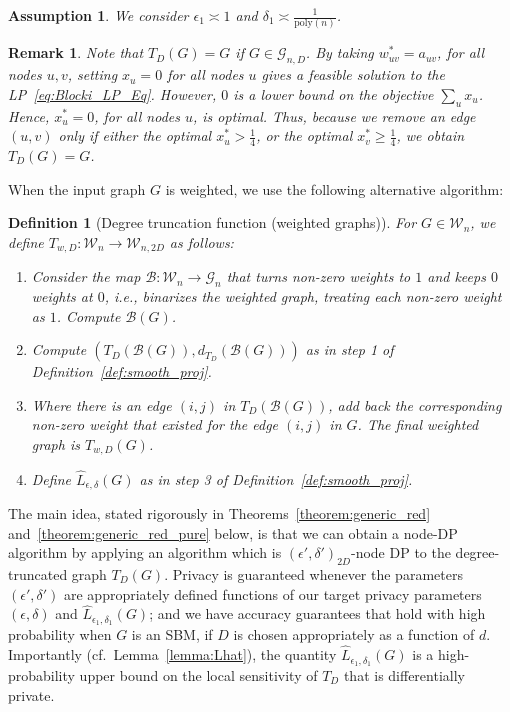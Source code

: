 \documentclass{article}
\newtheorem{remark}{Remark}
\newtheorem{definition}{Definition}
\newtheorem{assumption}{Assumption}
\begin{document}
\begin{assumption}
\label{ASS_eps_1_delt_1}
We consider $\epsilon_1 \asymp 1$ and $\delta_1 \asymp \frac{1}{\mathrm{poly}(n)}$.
\end{assumption}

\begin{remark}
\label{remark:No_trunc}
Note that $T_D(G) = G$ if $G \in \mathcal{G}_{n, D}$. By taking $w_{uv}^* = a_{uv}$, for all nodes $u, v$, setting $x_u = 0$ for all nodes $u$ gives a feasible solution to the LP~\eqref{eq:Blocki_LP_Eq}. However, $0$ is a lower bound on the objective $\sum_{u}x_u$. Hence, $x_u^* = 0$, for all nodes $u$, is optimal. Thus, because we remove an edge $(u, v)$ only if either the optimal $x_u^* > \frac{1}{4}$, or the optimal $x_v^* \geq \frac{1}{4}$, we obtain $T_D(G) = G$.
\end{remark}

When the input graph $G$ is weighted, we use the following alternative algorithm:
\begin{definition} [Degree truncation function (weighted graphs)]
\label{def:weight_smooth_proj}
For $G \in \mathcal{W}_n$, we define $T_{w,D} : \mathcal{W}_n \rightarrow \mathcal{W}_{n, 2D}$ as follows: 
\begin{enumerate}
    \item Consider the map $\mathcal{B} : \mathcal{W}_n \rightarrow \mathcal{G}_n$ that turns non-zero weights to $1$ and keeps $0$ weights at $0$, i.e., binarizes the weighted graph, treating each non-zero weight as $1$. Compute $\mathcal{B}(G)$.
    \item Compute $(T_{D}(\mathcal{B}(G)), d_{T_D}(\mathcal{B}(G)))$ as in step 1 of Definition~\ref{def:smooth_proj}.
    \item Where there is an edge $(i, j)$ in $T_{D}(\mathcal{B}(G))$, add back the corresponding non-zero weight that existed for the edge $(i, j)$ in $G$. The final weighted graph is $T_{w,D}(G)$.
    \item Define $\hat{L}_{\epsilon, \delta}(G)$ as in step 3 of Definition~\ref{def:smooth_proj}.
\end{enumerate}
\end{definition}

The main idea, stated rigorously in Theorems~\ref{theorem:generic_red} and~\ref{theorem:generic_red_pure} below, is that we can obtain a node-DP algorithm by applying an algorithm which is $(\epsilon', \delta')_{2D}$-node DP to the degree-truncated graph $T_D(G)$. Privacy is guaranteed whenever the parameters $(\epsilon', \delta')$ are appropriately defined functions of our target privacy parameters $(\epsilon, \delta)$ and $\hat{L}_{\epsilon_1, \delta_1}(G)$; and we have accuracy guarantees that hold with high probability when $G$ is an SBM, if $D$ is chosen appropriately as a function of $d$. Importantly (cf.\ Lemma~\ref{lemma:Lhat}), the quantity $\hat{L}_{\epsilon_1, \delta_1}(G)$ is a high-probability upper bound on the local sensitivity of $T_D$ that is differentially private.
\end{document}
